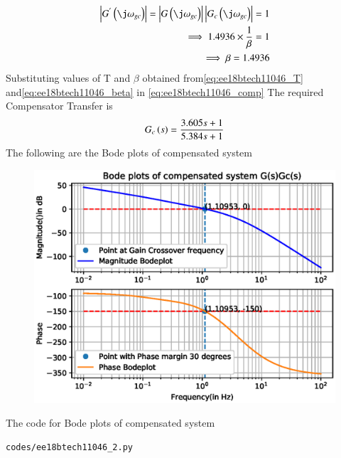 \begin{align}
\abs{G^{'}\brak{\j\omega_{gc}}} = \abs{G\brak{\j\omega_{gc}}}\abs{G_{c}\brak{\j\omega_{gc}}} = 1
\\
\implies
1.4936 \times \frac{1}{\beta} = 1
\\
\implies
\beta = 1.4936
\label{eq:ee18btech11046_beta}
\end{align} 
Substituting values of T and $\beta$ obtained from\eqref{eq:ee18btech11046_T} and\eqref{eq:ee18btech11046_beta} in \eqref{eq:ee18btech11046_comp}
The required Compensator Transfer is
\begin{align}
G_{c}\left(s\right) = \frac{3.605s+1}{5.384s+1}
\end{align}
The following are the Bode plots of compensated system
\begin{figure}[!h]
\centering
  \includegraphics[width=\columnwidth]{./figs/ee18btech11046_2.eps}
\caption{}
\label{fig:ee18btech11046_compensated} 
\end{figure}
%

The code for Bode plots of compensated system 
\begin{lstlisting}
codes/ee18btech11046_2.py
\end{lstlisting}
% 


